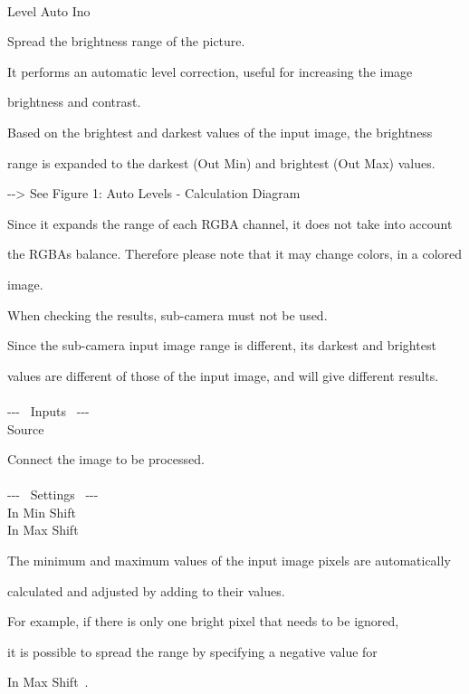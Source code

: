 \documentclass[a4paper,12pt]{article}
\begin{document}
\thispagestyle{empty}

\Large
\noindent \\
Level Auto Ino\medskip
\par
\normalsize
Spread the brightness range of the picture.\\
\par
It performs an automatic level correction, useful for increasing the image\par 
brightness and contrast.\\
\par
Based on the brightest and darkest values of the input image, the brightness\par 
range is expanded to the darkest (Out Min) and brightest (Out Max) values.\par
-{-}> See Figure 1: \textquotedbl Auto Levels - Calculation Diagram\textquotedbl\\
\par
Since it expands the range of each RGBA channel, it does not take into account\par
the RGBA\textquotesingle s balance. Therefore please note that it may change colors, in a colored\par
image.\\
\par
When checking the results, sub-camera must not be used.\par
Since the sub-camera input image range is different, its darkest and brightest\par 
values are different of those of the input image, and will give different results.\\
\\
-{-}- \ Inputs \ -{-}-\\
Source\par
Connect the image to be processed.\\
\\
-{-}- \ Settings \ -{-}-\\
In Min Shift\\
In Max Shift\par
The minimum and maximum values of the input image pixels are automatically\par calculated and adjusted by adding to their values.\par
For example, if there is only one bright pixel that needs to be ignored,\par
it is possible to spread the range by specifying a negative value for\par 
\textquotedbl In Max Shift\textquotedbl \ .\par
\end{document}
